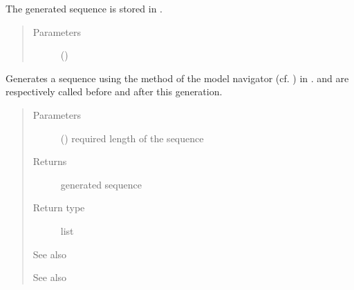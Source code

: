 \documentclass[letterpaper,10pt,english]{sphinxmanual}
\begin{document}
\begin{fulllineitems}
\begin{fulllineitems}
The generated sequence is stored in .
\begin{quote}\begin{description}
\item[{Parameters}] \leavevmode
{} ({\hyperref[\detokenize{index:Query.Query}]{}}) \textendash{} 

\end{description}\end{quote}

\end{fulllineitems}


\begin{fulllineitems}
\label{\detokenize{index:Generator.Generator.handle_free_generation}}
Generates a sequence using the method {\hyperref[\detokenize{index:Navigator.Navigator.free_generation}]{}} of the model navigator (cf. ) in . {\hyperref[\detokenize{index:Generator.Generator.encode_memory_with_current_transfo}]{}} and {\hyperref[\detokenize{index:Generator.Generator.decode_memory_with_current_transfo}]{}} are respectively called before and after this generation.
\begin{quote}\begin{description}
\item[{Parameters}] \leavevmode
{} () \textendash{} required length of the sequence

\item[{Returns}] \leavevmode
generated sequence

\item[{Return type}] \leavevmode
list

\item[{See also}] \leavevmode
{\hyperref[\detokenize{index:Navigator.Navigator.free_generation}]{}}

\item[{See also}] \leavevmode
{\hyperref[\detokenize{index:module-MetaModelNavigator}]{}}


\end{description}
\end{quote}
\end{fulllineitems}
\end{fulllineitems}
\end{document}
